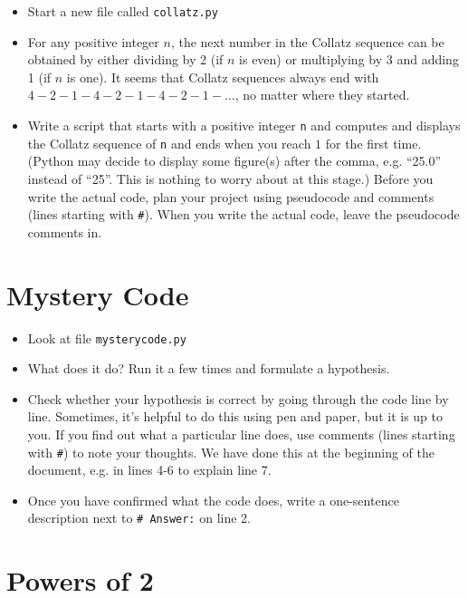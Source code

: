 \documentclass[pdflatex,a4paper]{article}
\begin{document}
\begin{itemize}
\item
Start a new file called \verb=collatz.py=
\item
For any positive integer \(n\), the next number in the Collatz sequence can be obtained by either dividing by 2 (if \(n\) is even) or multiplying by 3 and adding 1 (if \(n\) is one). It seems that Collatz sequences always end with \(4-2-1-4-2-1-4-2-1-\dots\), no matter where they started. 
\item
Write a script that starts with a positive integer \verb=n= and computes and displays the Collatz sequence of \verb-n- and ends when you reach \(1\) for the first time. (Python may decide to display some figure(s) after the comma, e.g. ``25.0'' instead of ``25''. This is nothing to worry about at this stage.) Before you write the actual code, plan your project using pseudocode and comments (lines starting with \verb=#=). When you write the actual code, leave the pseudocode comments in.
\end{itemize}



\section{Mystery Code}
\begin{itemize}
\item
Look at file \verb=mysterycode.py=
\item
What does it do? Run it a few times and formulate a hypothesis. 
\item
Check whether your hypothesis is correct by going through the code line by line. Sometimes, it's helpful to do this using pen and paper, but it is up to you. If you find out what a particular line does, use comments (lines starting with \verb=#=) to note your thoughts. We have done this at the beginning of the document, e.g. in lines 4-6 to explain line 7. 
\item
Once you have confirmed what the code does, write a one-sentence description next to \verb=# Answer:= on line 2.
\end{itemize}




\section{Powers of 2}
\end{document}
